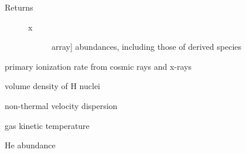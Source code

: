 \documentclass[letterpaper,10pt,english]{sphinxmanual}
\begin{document}
\begin{fulllineitems}
\begin{fulllineitems}
\begin{description}
\begin{description}
\end{description}

\item[{Returns}] \leavevmode\begin{description}
\item[{x}] \leavevmode{[}array{]}
abundances, including those of derived species

\end{description}

\end{description}

\end{fulllineitems}


\begin{fulllineitems}
\label{fulldoc:despotic.chemistry.NL99.ionRate}
primary ionization rate from cosmic rays and x-rays

\end{fulllineitems}


\begin{fulllineitems}
\label{fulldoc:despotic.chemistry.NL99.nH}
volume density of H nuclei

\end{fulllineitems}


\begin{fulllineitems}
\label{fulldoc:despotic.chemistry.NL99.sigmaNT}
non-thermal velocity dispersion

\end{fulllineitems}


\begin{fulllineitems}
\label{fulldoc:despotic.chemistry.NL99.temp}
gas kinetic temperature

\end{fulllineitems}


\begin{fulllineitems}
\label{fulldoc:despotic.chemistry.NL99.xHe}
He abundance

\end{fulllineitems}


\end{fulllineitems}
\end{document}
